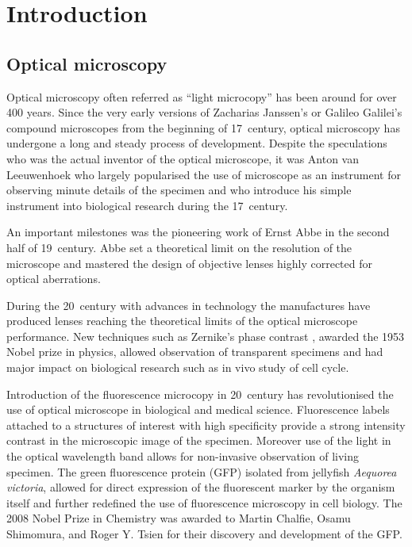 \chapter{Introduction}


\section{Optical microscopy}

Optical microscopy often referred as ``light microcopy'' has been around for over 400 years. Since the very early versions of Zacharias Janssen's or Galileo Galilei's compound microscopes from the beginning of 17\ths\ century, optical microscopy has undergone a long and steady process of development. Despite the speculations who was the actual inventor of the optical microscope, it was Anton van Leeuwenhoek who largely popularised the use of microscope as an instrument for observing minute details of the specimen and who introduce his simple instrument into biological research during the 17\ths\ century. 

An important milestones was the pioneering work of Ernst Abbe \cite{Abbe1873} in the second half of 19\ths\ century. Abbe set a theoretical limit on the resolution of the microscope and mastered the design of objective lenses highly corrected for optical aberrations.

During the 20\ths\ century with advances in technology the manufactures have produced lenses reaching the theoretical limits of the optical microscope performance. New techniques such as Zernike's phase contrast \cite{Zernike1942}, awarded the 1953 Nobel prize in physics, allowed observation of transparent specimens and had major impact on biological research such as in vivo study of cell cycle. 

Introduction of the fluorescence microcopy in 20\ths\ century has revolutionised the use of optical microscope in biological and medical science. Fluorescence labels attached to a structures of interest with high specificity provide a strong intensity contrast in the microscopic image of the specimen. Moreover use of the light in the optical wavelength band allows for non-invasive observation of living specimen. The green fluorescence protein (GFP) isolated from jellyfish {\it Aequorea victoria}, allowed for direct expression of the fluorescent marker by the organism itself and further redefined the use of fluorescence microscopy in cell biology. The 2008 Nobel Prize in Chemistry was awarded to Martin Chalfie, Osamu Shimomura, and Roger Y. Tsien for their discovery and development of the GFP.

